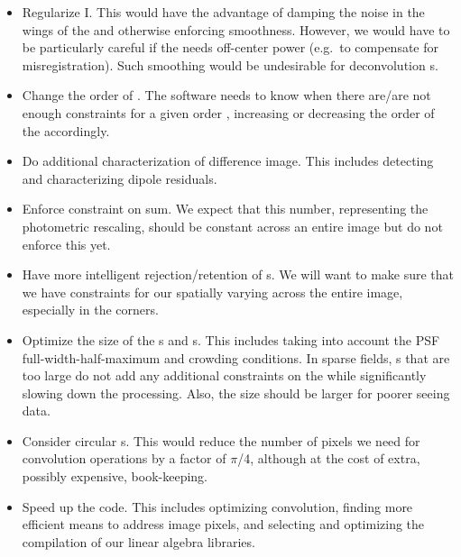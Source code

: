 \begin{itemize}

\item Regularize  I. This would have the advantage of 
   damping the noise in the wings of the  and otherwise
   enforcing smoothness.  However, we would have to be particularly
   careful if the  needs off-center power (e.g.~to
   compensate for misregistration).  Such smoothing would be
   undesirable for deconvolution s.

\item Change the order of . The software needs to 
   know when there are/are not enough constraints for a given order
   , increasing or decreasing the order of the
    accordingly.

\item Do additional characterization of difference image. This includes 
   detecting and characterizing dipole residuals.

\item Enforce constraint on  sum. We expect that 
   this number, representing the photometric rescaling, should be
   constant across an entire image but do not enforce this yet.

\item Have more intelligent rejection/retention of s.  We 
   will want to make sure that we have constraints for our spatially
   varying  across the entire image, especially in the
   corners.

\item Optimize the size of the s and 
   s. This includes taking into account the PSF
   full-width-half-maximum and crowding conditions.  In sparse
   fields, s that are too large do not add any
   additional constraints on the  while significantly
   slowing down the processing.  Also, the  size should
   be larger for poorer seeing data.

\item Consider circular s. This would reduce the number of 
   pixels we need for convolution operations by a factor of $\pi$/4,
   although at the cost of extra, possibly expensive, book-keeping.

\item Speed up the code. This includes optimizing convolution, finding 
   more efficient means to address image pixels, and selecting and
   optimizing the compilation of our linear algebra libraries.


\end{itemize}
